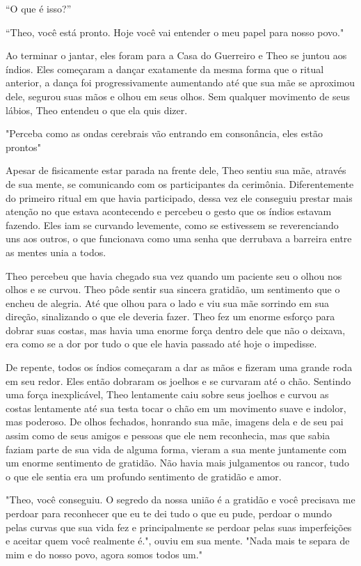``O que é isso?''

``Theo, você está pronto. Hoje você vai entender o meu papel para nosso
povo."

Ao terminar o jantar, eles foram para a Casa do Guerreiro e Theo se
juntou aos índios. Eles começaram a dançar exatamente da mesma forma que
o ritual anterior, a dança foi progressivamente aumentando até que sua
mãe se aproximou dele, segurou suas mãos e olhou em seus olhos. Sem
qualquer movimento de seus lábios, Theo entendeu o que ela quis dizer.

"Perceba como as ondas cerebrais vão entrando em consonância, eles estão
prontos"

Apesar de fisicamente estar parada na frente dele, Theo sentiu sua mãe,
através de sua mente, se comunicando com os participantes da cerimônia.
Diferentemente do primeiro ritual em que havia participado, dessa vez
ele conseguiu prestar mais atenção no que estava acontecendo e percebeu
o gesto que os índios estavam fazendo. Eles iam se curvando levemente,
como se estivessem se reverenciando uns aos outros, o que funcionava
como uma senha que derrubava a barreira entre as mentes unia a todos.

Theo percebeu que havia chegado sua vez quando um paciente seu o olhou
nos olhos e se curvou. Theo pôde sentir sua sincera gratidão, um
sentimento que o encheu de alegria. Até que olhou para o lado e viu sua
mãe sorrindo em sua direção, sinalizando o que ele deveria fazer. Theo
fez um enorme esforço para dobrar suas costas, mas havia uma enorme
força dentro dele que não o deixava, era como se a dor por tudo o que
ele havia passado até hoje o impedisse.

De repente, todos os índios começaram a dar as mãos e fizeram uma grande
roda em seu redor. Eles então dobraram os joelhos e se curvaram até o
chão. Sentindo uma força inexplicável, Theo lentamente caiu sobre seus
joelhos e curvou as costas lentamente até sua testa tocar o chão em um
movimento suave e indolor, mas poderoso. De olhos fechados, honrando sua
mãe, imagens dela e de seu pai assim como de seus amigos e pessoas que
ele nem reconhecia, mas que sabia faziam parte de sua vida de alguma
forma, vieram a sua mente juntamente com um enorme sentimento de
gratidão. Não havia mais julgamentos ou rancor, tudo o que ele sentia
era um profundo sentimento de gratidão e amor.

"Theo, você conseguiu. O segredo da nossa união é a gratidão e você
precisava me perdoar para reconhecer que eu te dei tudo o que eu pude,
perdoar o mundo pelas curvas que sua vida fez e principalmente se
perdoar pelas suas imperfeições e aceitar quem você realmente é.", ouviu
em sua mente. "Nada mais te separa de mim e do nosso povo, agora somos
todos um."

